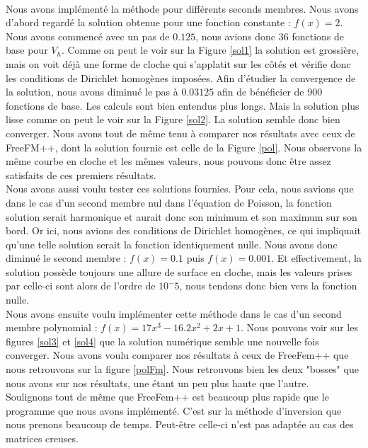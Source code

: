 \paragraph{} Nous avons implémenté la méthode pour différents seconds membres. Nous avons d'abord regardé la solution obtenue pour une fonction constante : $f(x)=2$. Nous avons commencé avec un pas de $0.125$, nous avions donc 36 fonctions de base pour $V_h$. Comme on peut le voir sur la Figure \ref{sol1} la solution est grossière, mais on voit déjà une forme de cloche qui s'applatit sur les côtés et vérifie donc les conditions de Dirichlet homogènes imposées. Afin d'étudier la convergence de la solution, nous avons diminué le pas à $0.03125$ afin de bénéficier de 900 fonctions de base. Les calculs sont bien entendus plus longs. Mais la solution plus lisse comme on peut le voir sur la Figure \ref{sol2}. La solution semble donc bien converger. Nous avons tout de même tenu à comparer nos résultats avec ceux de FreeFM++, dont la solution fournie est celle de la Figure \ref{pol}. Nous observons la même courbe en cloche et les mêmes valeurs, nous pouvons donc être assez satisfaits de ces premiers résultats.\\

Nous avons aussi voulu tester ces solutions fournies. Pour cela, nous savions que dans le cas d'un second membre nul dans l'équation de Poisson, la fonction solution serait harmonique et aurait donc son minimum et son maximum sur son bord. Or ici, nous avions des conditions de Dirichlet homogènes, ce qui impliquait qu'une telle solution serait la fonction identiquement nulle. Nous avons donc diminué le second membre : $f(x)=0.1$ puis $f(x)=0.001$. Et effectivement, la solution possède toujours une allure de surface en cloche, mais les valeurs prises par celle-ci sont alors de l'ordre de $10^-5$, nous tendons donc bien vers la fonction nulle.\\

Nous avons ensuite voulu implémenter cette méthode dans le cas d'un second membre polynomial : $f(x)=17x^3-16.2x^2+2x+1$. Nous pouvons voir sur les figures \ref{sol3} et \ref{sol4} que la solution numérique semble une nouvelle fois converger. Nous avons voulu comparer nos résultats à ceux de FreeFem++ que nous retrouvons sur la figure \ref{polFm}. Nous retrouvons bien les deux "bosses" que nous avons sur nos résultats, une étant un peu plus haute que l'autre.\\

Soulignons tout de même que FreeFem++ est beaucoup plus rapide que le programme que nous avons implémenté. C'est sur la méthode d'inversion que nous prenons beaucoup de temps. Peut-être celle-ci n'est pas adaptée au cas des matrices creuses.  
 
